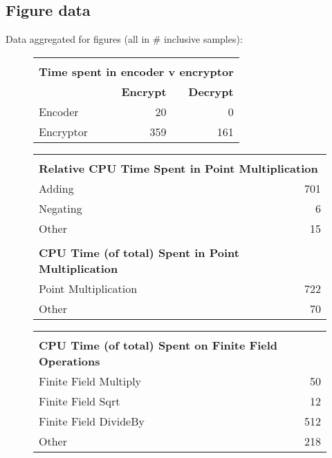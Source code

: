 \subsection{Figure data}

Data aggregated for figures (all in \# inclusive samples):

\begin{figure}[h!]
\begin{tabular}{|l|r|r|}
	\hline
    \multicolumn{3}{|l|}{} \\
	\multicolumn{3}{|l|}{\textbf{Time spent in encoder v encryptor}} \\
    \hline
	& \textbf{Encrypt} & \textbf{Decrypt} \\
	Encoder & 20 & 0 \\
	Encryptor & 359 & 161 \\
	\hline
\end{tabular}
\end{figure}

\begin{figure}[h!]
\begin{tabular}{|l|r|}
	\hline
    \multicolumn{2}{|l|}{} \\
	\multicolumn{2}{|l|}{\textbf{Relative CPU Time Spent in Point Multiplication}} \\
    \hline
	Adding & 701 \\
	Negating & 6 \\
	Other & 15 \\
	\hline
    \multicolumn{2}{|l|}{} \\
	\multicolumn{2}{|l|}{\textbf{CPU Time (of total) Spent in Point Multiplication}} \\
    \hline
	Point Multiplication & 722 \\
	Other & 70 \\
	\hline
\end{tabular}
\end{figure}

\begin{figure}[h!]
\begin{tabular}{|l|r|}
	\hline
    \multicolumn{2}{|l|}{} \\
	\multicolumn{2}{|l|}{\textbf{CPU Time (of total) Spent on Finite Field Operations}} \\
    \hline
	Finite Field Multiply & 50 \\
	Finite Field Sqrt & 12 \\
	Finite Field DivideBy & 512 \\
	Other & 218 \\
	\hline
\end{tabular}
\end{figure}

